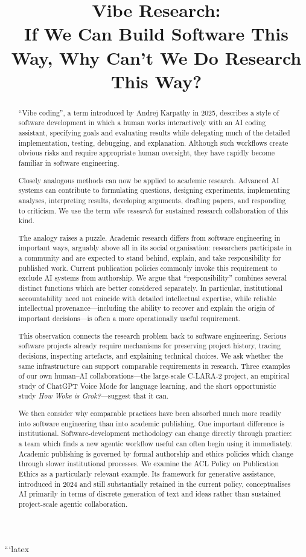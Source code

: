 ```latex
\title{Vibe Research:\\
If We Can Build Software This Way, Why Can't We Do Research This Way?}

\begin{abstract}
``Vibe coding'', a term introduced by Andrej Karpathy in 2025, describes a style of software development in which a human works interactively with an AI coding assistant, specifying goals and evaluating results while delegating much of the detailed implementation, testing, debugging, and explanation. Although such workflows create obvious risks and require appropriate human oversight, they have rapidly become familiar in software engineering.

Closely analogous methods can now be applied to academic research. Advanced AI systems can contribute to formulating questions, designing experiments, implementing analyses, interpreting results, developing arguments, drafting papers, and responding to criticism. We use the term \emph{vibe research} for sustained research collaboration of this kind.

The analogy raises a puzzle. Academic research differs from software engineering in important ways, arguably above all in its social organisation: researchers participate in a community and are expected to stand behind, explain, and take responsibility for published work. Current publication policies commonly invoke this requirement to exclude AI systems from authorship. We argue that ``responsibility'' combines several distinct functions which are better considered separately. In particular, institutional accountability need not coincide with detailed intellectual expertise, while reliable intellectual provenance---including the ability to recover and explain the origin of important decisions---is often a more operationally useful requirement.

This observation connects the research problem back to software engineering. Serious software projects already require mechanisms for preserving project history, tracing decisions, inspecting artefacts, and explaining technical choices. We ask whether the same infrastructure can support comparable requirements in research. Three examples of our own human--AI collaborations---the large-scale C-LARA-2 project, an empirical study of ChatGPT Voice Mode for language learning, and the short opportunistic study \emph{How Woke is Grok?}---suggest that it can.

We then consider why comparable practices have been absorbed much more readily into software engineering than into academic publishing. One important difference is institutional. Software-development methodology can change directly through practice: a team which finds a new agentic workflow useful can often begin using it immediately. Academic publishing is governed by formal authorship and ethics policies which change through slower institutional processes. We examine the ACL Policy on Publication Ethics as a particularly relevant example. Its framework for generative assistance, introduced in 2024 and still substantially retained in the current policy, conceptualises AI primarily in terms of discrete generation of text and ideas rather than sustained project-scale agentic collaboration.


\end{abstract}
